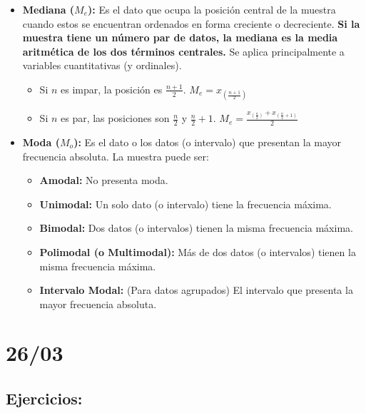 \documentclass[12pt, letterpaper]{article}
\begin{document}
\begin{itemize}
    \item \textbf{Mediana ($M_e$):} Es el dato que ocupa la posición central de la muestra cuando estos se encuentran ordenados en forma creciente o decreciente. \textbf{Si la muestra tiene un número par de datos, la mediana es la media aritmética de los dos términos centrales.} Se aplica principalmente a variables cuantitativas (y ordinales). %
        \begin{itemize}
            \item Si $n$ es impar, la posición es $\frac{n+1}{2}$. $M_e = x_{(\frac{n+1}{2})}$ %
            \item Si $n$ es par, las posiciones son $\frac{n}{2}$ y $\frac{n}{2}+1$. $M_e = \frac{x_{(\frac{n}{2})} + x_{(\frac{n}{2}+1)}}{2}$ %
        \end{itemize}
    \item \textbf{Moda ($M_o$):} Es el dato o los datos (o intervalo) que presentan la mayor frecuencia absoluta. La muestra puede ser: %
        \begin{itemize}
            \item \textbf{Amodal:} No presenta moda.
            \item \textbf{Unimodal:} Un solo dato (o intervalo) tiene la frecuencia máxima. %
            \item \textbf{Bimodal:} Dos datos (o intervalos) tienen la misma frecuencia máxima. %
            \item \textbf{Polimodal (o Multimodal):} Más de dos datos (o intervalos) tienen la misma frecuencia máxima. %
            \item \textbf{Intervalo Modal:} (Para datos agrupados) El intervalo que presenta la mayor frecuencia absoluta.
        \end{itemize}
\end{itemize}
\newpage

\section{26/03}
\subsection{Ejercicios:}
\end{document}
